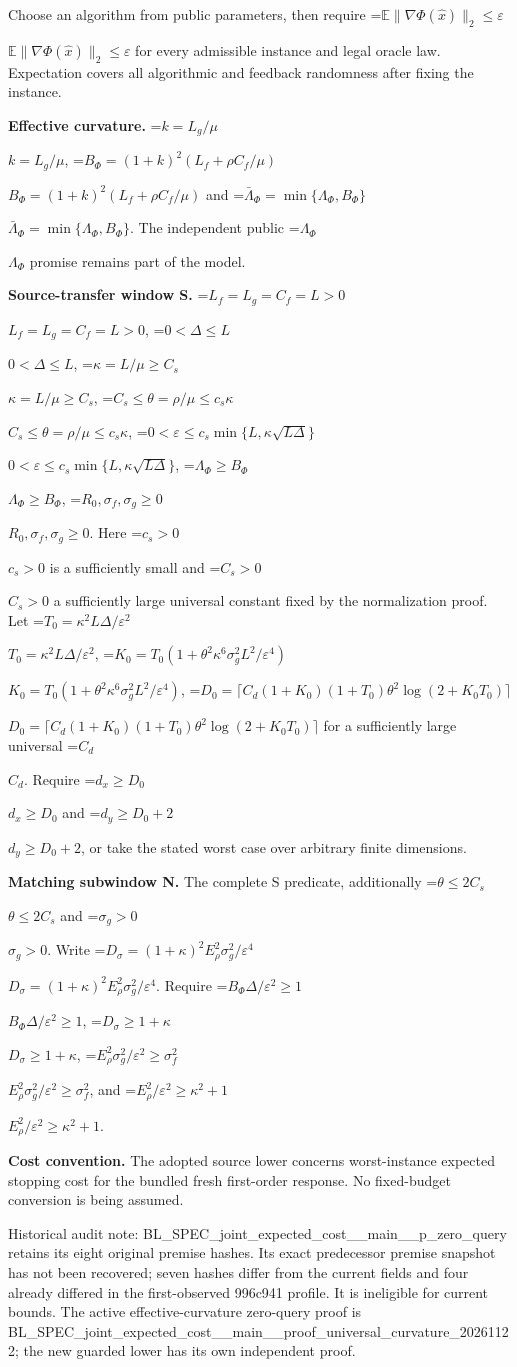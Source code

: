 \documentclass[10pt,a4paper]{article}
\newcommand{\AtlasMath}[1]{\par\begingroup\centering\setbox0=\hbox{$\displaystyle #1$}\ifdim\wd0>1.4\linewidth\typeout{ATLAS WIDE FORMULA: \the\wd0}\fi\ifdim\wd0>\linewidth\resizebox{\linewidth}{!}{\box0}\else\box0\fi\par\endgroup}
\newcommand{\AtlasInlineMath}[1]{\begingroup\setbox0=\hbox{$#1$}\ifdim\wd0>.4\linewidth\endgroup\AtlasMath{#1}\else\endgroup$#1$\fi}
\begin{document}
Choose an algorithm from public parameters, then require \AtlasInlineMath{\mathbb{E}\|\nabla\Phi(\widehat{x})\|_2\le\varepsilon} for every admissible instance and legal oracle law. Expectation covers all algorithmic and feedback randomness after fixing the instance.



\textbf{Effective curvature.} \AtlasInlineMath{k=L_g/\mu}, \AtlasInlineMath{B_\Phi=(1+k)^2(L_f+\rho C_f/\mu)} and \AtlasInlineMath{\bar\Lambda_\Phi=\min\{\Lambda_\Phi,B_\Phi\}}. The independent public \AtlasInlineMath{\Lambda_\Phi} promise remains part of the model.



\textbf{Source-transfer window S.} \AtlasInlineMath{L_f=L_g=C_f=L>0}, \AtlasInlineMath{0<\Delta\le L}, \AtlasInlineMath{\kappa=L/\mu\ge C_s}, \AtlasInlineMath{C_s\le\theta=\rho/\mu\le c_s\kappa}, \AtlasInlineMath{0<\varepsilon\le c_s\min\{L,\kappa\sqrt{L\Delta}\}}, \AtlasInlineMath{\Lambda_\Phi\ge B_\Phi}, \AtlasInlineMath{R_0,\sigma_f,\sigma_g\ge0}. Here \AtlasInlineMath{c_s>0} is a sufficiently small and \AtlasInlineMath{C_s>0} a sufficiently large universal constant fixed by the normalization proof. Let \AtlasInlineMath{T_0=\kappa^2L\Delta/\varepsilon^2}, \AtlasInlineMath{K_0=T_0(1+\theta^2\kappa^6\sigma_g^2L^2/\varepsilon^4)}, \AtlasInlineMath{D_0=\lceil C_d(1+K_0)(1+T_0)\theta^2\log(2+K_0T_0)\rceil} for a sufficiently large universal \AtlasInlineMath{C_d}. Require \AtlasInlineMath{d_x\ge D_0} and \AtlasInlineMath{d_y\ge D_0+2}, or take the stated worst case over arbitrary finite dimensions.



\textbf{Matching subwindow N.} The complete S predicate, additionally \AtlasInlineMath{\theta\le2C_s} and \AtlasInlineMath{\sigma_g>0}. Write \AtlasInlineMath{D_\sigma=(1+\kappa)^2 E_\rho^2\sigma_g^2/\varepsilon^4}. Require \AtlasInlineMath{B_\Phi\Delta/\varepsilon^2\ge1}, \AtlasInlineMath{D_\sigma\ge1+\kappa}, \AtlasInlineMath{E_\rho^2\sigma_g^2/\varepsilon^2\ge\sigma_f^2}, and \AtlasInlineMath{E_\rho^2/\varepsilon^2\ge\kappa^2+1}.



\textbf{Cost convention.} The adopted source lower concerns worst-instance expected stopping cost for the bundled fresh first-order response. No fixed-budget conversion is being assumed.



Historical audit note: BL\_SPEC\_joint\_expected\_c\allowbreak{}ost\_\_main\_\_p\_zero\_query retains its eight original premise hashes. Its exact predecessor premise snapshot has not been recovered; seven hashes differ from the current fields and four already differed in the first-observed 996c941 profile. It is ineligible for current bounds. The active effective-curvature zero-query proof is BL\_SPEC\_joint\_expected\_c\allowbreak{}ost\_\_main\_\_proof\_univers\allowbreak{}al\_curvature\_20261122; the new guarded lower has its own independent proof.
\end{document}
